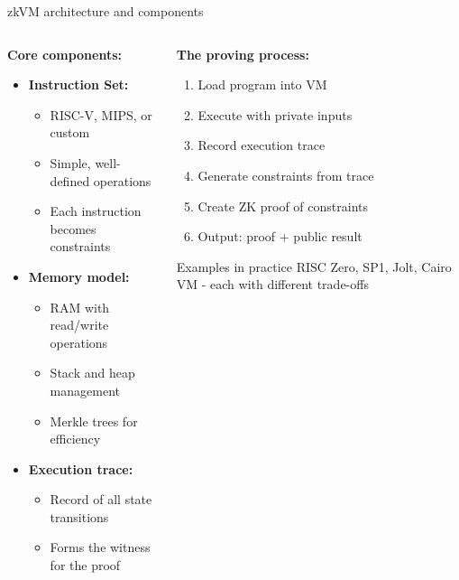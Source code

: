 \documentclass[aspectratio=169, lualatex, handout]{beamer}
\begin{document}
\begin{frame}{zkVM architecture and components}
	\begin{columns}[c]
		\begin{column}{0.5\textwidth}
			\textbf{Core components:}
			\begin{itemize}
				\item \textbf{Instruction Set:}
				      \begin{itemize}
					      \item RISC-V, MIPS, or custom
					      \item Simple, well-defined operations
					      \item Each instruction becomes constraints
				      \end{itemize}
				\item \textbf{Memory model:}
				      \begin{itemize}
					      \item RAM with read/write operations
					      \item Stack and heap management
					      \item Merkle trees for efficiency
				      \end{itemize}
				\item \textbf{Execution trace:}
				      \begin{itemize}
					      \item Record of all state transitions
					      \item Forms the witness for the proof
				      \end{itemize}
			\end{itemize}
		\end{column}
		\begin{column}{0.5\textwidth}
			\textbf{The proving process:}
			\begin{enumerate}
				\item Load program into VM
				\item Execute with private inputs
				\item Record execution trace
				\item Generate constraints from trace
				\item Create ZK proof of constraints
				\item Output: proof + public result
			\end{enumerate}
			\vspace{0.5em}
			\begin{exampleblock}{Examples in practice}
				RISC Zero, SP1, Jolt, Cairo VM - each with different trade-offs
			\end{exampleblock}
		\end{column}
	\end{columns}
\end{frame}
\end{document}
